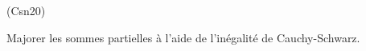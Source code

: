 \begin{tiny}(Csn20)\end{tiny} Majorer les sommes partielles à l'aide de l'inégalité de Cauchy-Schwarz. 